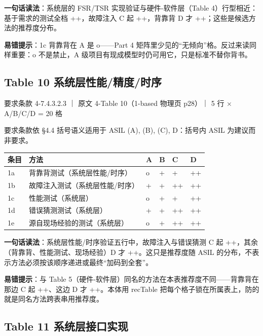 \textbf{一句话读法}：系统层的 FSR/TSR 实现验证与硬件-软件层（Table 4）行型相近：基于需求的测试全档 ++，故障注入 C 起 ++，背靠背 D 才 ++；这些是候选方法的推荐度分布。

\textbf{易错提示}：1c 背靠背在 A 是 o——Part 4 矩阵里少见的“无倾向”格。反过来读同样重要：o 不是禁止，A 级项目有现成模型时仍可用它，只是标准不替你背书。

\subsection{Table 10 系统层性能/精度/时序}

要求条款 4-7.4.3.2.3 ｜ 原文 4-Table 10（1-based 物理页 p28）｜ 5 行 \(\times\) A/B/C/D = 20 格

\begin{noteblock}
要求条款依 §4.4 括号语义适用于 ASIL (A), (B), (C), D：括号内 ASIL 为建议而非要求。
\end{noteblock}

\begin{center}
\begingroup\small
\setlength{\tabcolsep}{4pt}
\begin{tabularx}{\linewidth}{@{}XXXXXX@{}}
\toprule
条目 & 方法 & A & B & C & D \\
\midrule
1a & 背靠背测试（系统层性能/时序） & o & + & + & ++ \\
1b & 故障注入测试（系统层性能/时序） & + & + & ++ & ++ \\
1c & 性能测试（系统层） & o & + & + & ++ \\
1d & 错误猜测测试（系统层） & + & + & ++ & ++ \\
1e & 源自现场经验的测试（系统层） & o & + & ++ & ++ \\
\bottomrule
\end{tabularx}
\endgroup
\end{center}

\textbf{一句话读法}：系统层性能/时序验证五行中，故障注入与错误猜测 C 起 ++，其余（背靠背、性能测试、现场经验）D 才 ++。这只是推荐度随 ASIL 的分布，不表示方法必须按该顺序递进或最终“加码到全套”。

\textbf{易错提示}：与 Table 5（硬件-软件层）同名的方法在本表推荐度不同——背靠背在那边 C 起 ++、这边 D 才 ++。本体用 recTable 把每个格子锁在所属表上，防的就是同名方法跨表串用推荐度。

\subsection{Table 11 系统层接口实现}

